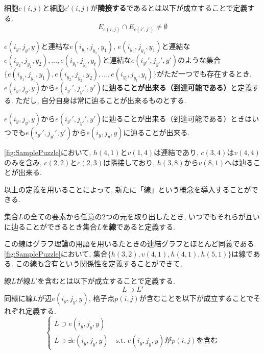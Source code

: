 \begin{definition}[隣接]\label{definition:Adjacent}
  細胞$c(i,j)$と細胞$c'(i,j)$が\textbf{隣接する}であるとは以下が成立することで定義する.
  \begin{equation*}
    E_{c(i,j)} \cap E_{c(i',j')} \neq \emptyset
  \end{equation*}
\end{definition}


\begin{definition}[到達可能]
  $e(i_y,j_y,y)$と連結な$e(i_{y_1},j_{y_1},y_1)$, $e(i_{y_1},j_{y_1},y_1)$と連結な$e(i_{y_2},j_{y_2},y_2),...,e(i_{y_t},j_{y_t},y_t)$と連結な$e(i_{y'}',j_{y'}',y')$のような集合\\
  $\{e(i_{y_1},j_{y_1},y_1),e(i_{y_2},j_{y_2},y_2),...,e(i_{y_t},j_{y_t},y_t)\}$がただ一つでも存在するとき, $e(i_y,j_y,y)$から$e(i_{y'}',j_{y'}',y')$に\textbf{辿ることが出来る（到達可能である）}と定義する. ただし, 自分自身は常に辿ることが出来るものとする.
\end{definition}

\begin{remark}
  $e(i_y,j_y,y)$から$e(i_{y'}',j_{y'}',y')$に辿ることが出来る（到達可能である）ときはいつでも$e(i_{y'}',j_{y'}',y')$から$e(i_y,j_y,y)$に辿ることが出来る.
\end{remark}

\begin{example}[連結, 含有, 隣接, 到達可能]
  \cref{fig:SamplePuzzle}において, $h(4,1)$と$v(1,4)$は連結であり, $c(3,4)$は$v(4,4)$のみを含み, $c(2,2)$と$c(2,3)$は隣接しており, $h(3,8)$から$v(8,1)$へは辿ることが出来る.
\end{example}
以上の定義を用いることによって, 新たに「線」という概念を導入することができる.

\begin{definition}[線]\label{definition:Line}
  集合$L$の全ての要素から任意の2つの元を取り出したとき, いつでもそれらが互いに辿ることができるとき集合$L$を\textbf{線}であると定義する.
\end{definition}
この線はグラフ理論の用語を用いるたときの連結グラフとほとんど同義である. \cref{fig:SamplePuzzle}において, 集合$\{h(3,2),v(4,1),h(4,1),h(5,1)\}$は線である. この線も含有という関係性を定義することができて,
\begin{definition}[線の含有]
  線$L$が線$L'$を含むとは以下が成立することで定義する.
  \begin{equation*}
    L\supset L'
  \end{equation*}
  同様に線$L$が辺$e(i_y,j_y,y)$, 格子点$p(i,j)$が含むことを以下が成立することでそれぞれ定義する.
  \begin{equation*}
    \begin{cases}
      {L\supset  e(i_y,j_y,y) } \\
      {L\ni \exists e(i_y,j_y,y) \quad \mbox{s.t. $e(i_y,j_y,y)$が$p(i,j)$を含む}}
    \end{cases}
  \end{equation*}
\end{definition}

